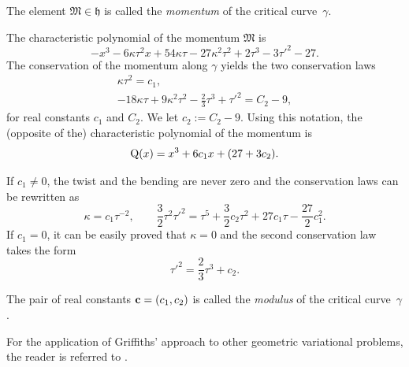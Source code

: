 \documentclass[10pt,a4paper]{amsart}
\numberwithin{equation}{section}
\begin{document}
\begin{Definition}
The element $\mathfrak{M}\in \mathfrak{h}$ is called the \textit{momentum} of
the critical curve~$\gamma$.
\end{Definition}

The characteristic polynomial of the momentum $\mathfrak{M}$ is
\begin{equation*}%
 -x^3 -6\kappa\tau^2 x +54\kappa\tau -27\kappa^2 \tau^2 +2\tau^3 -3\tau'^2 -27  .
 \end{equation*}
 The conservation of the momentum along {$\gamma$}
yields the two conservation laws
\begin{gather*}%
\kappa \tau^2 = {c_1} \label{CM1} ,\\
 - 18 \kappa \tau + 9 \kappa^2 \tau^2 -\frac23 \tau^3 + \tau'^2 = C_2 -9 \label{CM2} ,
\end{gather*}
for real constants $c_1$ and $C_2$. We let $c_2 := C_2-9$.
Using this notation,
the (opposite of the) characteristic polynomial of the momentum is
\begin{equation*}%
 {\rm Q}(x)=x^3+6c_1x+(27+3c_2).
 \end{equation*}

 If $c_1\neq 0$, the twist and the bending are never zero and the conservation laws can be rewritten as
\begin{equation}\label{cons-momentum-bis}
 \kappa=c_1\tau^{-2},\qquad \frac{3}{2} \tau^2\tau'^2=\tau^5+\frac{3}{2}c_2\tau^2+27c_1\tau-\frac{27}{2}c_1^2.
 \end{equation}
If $c_1=0$, it can be easily proved that $\kappa=0$ and the second conservation law takes the form
\begin{equation*}%
 \tau'^2 =\frac{2}{3}\tau^3+c_2.
 \end{equation*}
%
\begin{Definition}
The pair of real constants ${\bf c}=(c_1, c_2)$ is called the
\textit{modulus} of the critical curve~$\gamma$.

\end{Definition}

\begin{Remark}
For the application of Griffiths' approach to
other geometric variational problems, the reader is referred to
\cite{DMN,EMN-JMAA,Gr,GM,MN-CQG,MN-SIAM,MN-CAG}.
\end{Remark}
\end{document}
